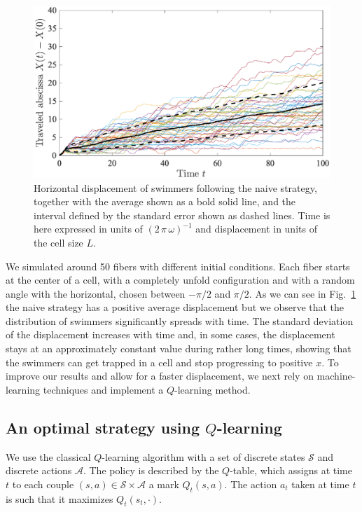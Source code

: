 \documentclass[aps,prl,preprint,groupedaddress]{revtex4-2}
\begin{document}
\begin{figure}[ht]
  \centerline{\includegraphics[width=\columnwidth]{travel_naive_diffreal}}
  \caption{\label{fig:travel_naive_diffreal} Horizontal displacement of swimmers following the naive strategy, together with the average shown as a bold solid line, and the interval defined by the standard error shown as dashed lines. Time is here expressed in units of $(2\,\pi\,\omega)^{-1}$ and displacement in units of the cell size $L$.}
\end{figure}
We simulated around 50 fibers with different initial conditions. Each fiber starts at the center of a cell, with a completely unfold configuration and with a random angle with the horizontal, chosen between $-{\pi}/{2}$ and ${\pi}/{2}$. As we can see in Fig.~\ref{fig:travel_naive_diffreal} the naive strategy has a positive average displacement but we observe that the distribution of swimmers significantly spreads with time. The standard deviation of the displacement increases with time and, in some cases, the displacement stays at an approximately constant value during rather long times, showing that the swimmers can get trapped in a cell and stop progressing to positive $x$.  To improve our results and allow for a faster displacement, we next rely on machine-learning techniques and implement a $Q$-learning method.


\subsection{An optimal strategy using $Q$-learning}
We use the classical $Q$-learning algorithm with a set of discrete states $\mathcal{S}$ and discrete actions $\mathcal{A}$. The policy is described by the $Q$-table, which assigns at time $t$ to each couple $(s,a)\in \mathcal{S}\times \mathcal{A}$ a mark $Q_t(s,a)$. The action $a_t$ taken at time $t$ is such that it maximizes $Q_t(s_t,\cdot)$.
\end{document}
